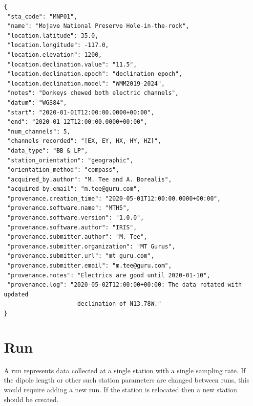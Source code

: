 \documentclass{article}
\begin{document}
\begin{verbatim}
{
 "sta_code": "MNP01",
 "name": "Mojave National Preserve Hole-in-the-rock",
 "location.latitude": 35.0,
 "location.longitude": -117.0,
 "location.elevation": 1200,
 "location.declination.value": "11.5",
 "location.declination.epoch": "declination epoch",
 "location.declination.model": "WMM2019-2024",
 "notes": "Donkeys chewed both electric channels",
 "datum": "WGS84",
 "start": "2020-01-01T12:00:00.0000+00:00",
 "end": "2020-01-12T12:00:00.0000+00:00",
 "num_channels": 5,
 "channels_recorded": "[EX, EY, HX, HY, HZ]",
 "data_type": "BB & LP",
 "station_orientation": "geographic",
 "orientation_method": "compass",
 "acquired_by.author": "M. Tee and A. Borealis",
 "acquired_by.email": "m.tee@guru.com",
 "provenance.creation_time": "2020-05-01T12:00:00.0000+00:00",
 "provenance.software.name": "MTH5",
 "provenance.software.version": "1.0.0",
 "provenance.software.author": "IRIS",
 "provenance.submitter.author": "M. Tee",
 "provenance.submitter.organization": "MT Gurus",
 "provenance.submitter.url": "mt_guru.com",
 "provenance.submitter.email": "m.tee@guru.com",
 "provenance.notes": "Electrics are good until 2020-01-10",
 "provenance.log": "2020-05-02T12:00:00+00:00: The data rotated with updated
                     declination of N13.78W."
}
\end{verbatim}

\newpage
\section{Run}

A run represents data collected at a single station with a single sampling rate. If the dipole length or other such station parameters are changed between runs, this would require adding a new run.  If the station is relocated then a new station should be created.
\end{document}
